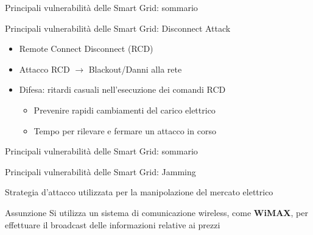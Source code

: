 \begin{frame}{Principali vulnerabilità delle Smart Grid: sommario}
\end{frame}

\begin{frame}{Principali vulnerabilità delle Smart Grid: Disconnect Attack}
	\begin{itemize}[<+- | alert@+>]
		\item Remote Connect Disconnect (RCD)
		\item Attacco RCD $\rightarrow$ Blackout/Danni alla rete
		\item Difesa: ritardi casuali nell'esecuzione dei comandi RCD
		\begin{itemize}
			\item Prevenire rapidi cambiamenti del carico elettrico
			\item Tempo per rilevare e fermare un attacco in corso
		\end{itemize}
	\end{itemize}
\end{frame}

\begin{frame}{Principali vulnerabilità delle Smart Grid: sommario}
\end{frame}

\begin{frame}{Principali vulnerabilità delle Smart Grid: Jamming}
	\begin{block}{}
	Strategia d'attacco utilizzata per la manipolazione del mercato elettrico
	\end{block}
	\pause
	\begin{block}{Assunzione}
	Si utilizza un sistema di comunicazione wireless, come \textbf{\color{blue_slides}WiMAX}, per effettuare il broadcast delle informazioni relative ai prezzi
	\end{block}
\end{frame}

